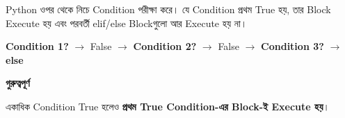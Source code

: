 
Python ওপর থেকে নিচে Condition পরীক্ষা করে।
যে Condition প্রথম
\textenglish{\ttfamily True}
হয়, তার Block Execute হয় এবং পরবর্তী
\textenglish{\ttfamily elif/else}
Blockগুলো আর Execute হয় না।

\begin{center}

\textbf{Condition 1?}
\(\longrightarrow\)
False
\(\longrightarrow\)
\textbf{Condition 2?}
\(\longrightarrow\)
False
\(\longrightarrow\)
\textbf{Condition 3?}
\(\longrightarrow\)
\textbf{else}

\end{center}

\begin{rememberbox}

\textbf{\color{deepOrange}গুরুত্বপূর্ণ}

একাধিক Condition True হলেও
\textbf{প্রথম True Condition-এর Block-ই Execute হয়}।

\end{rememberbox}



